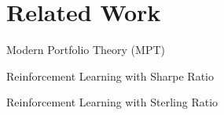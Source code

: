 \section{Related Work}
\begin{frame}{Modern Portfolio Theory (MPT)}
\end{frame}
\begin{frame}{Reinforcement Learning with Sharpe Ratio}
\end{frame}
\begin{frame}{Reinforcement Learning with Sterling Ratio}
\end{frame}